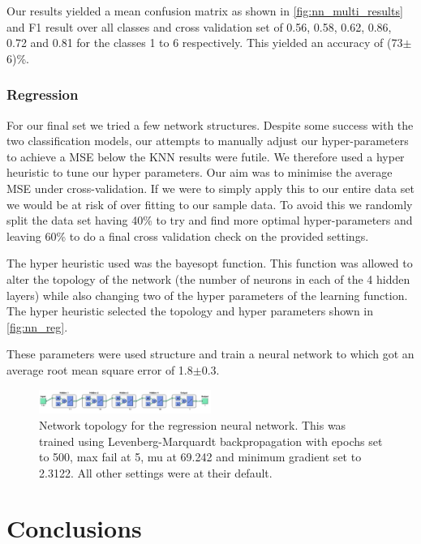 \documentclass[%
 reprint,
 amsmath,amssymb,
 aps,
]{revtex4-1}
\begin{document}
\par{Our results yielded a mean confusion matrix as shown in \autoref{fig:nn_multi_results} and F1 result over all classes and cross validation set of 0.56, 0.58, 0.62, 0.86, 0.72 and 0.81 for the classes 1 to 6 respectively. This yielded an accuracy of (73$\pm$6)\%.}


\subsubsection{Regression}

\par{For our final set we tried a few network structures. Despite some success with the two classification models, our attempts to manually adjust our hyper-parameters to achieve a MSE below the KNN results were futile. We therefore used a hyper heuristic to tune our hyper parameters. Our aim was to minimise the average MSE under cross-validation. If we were to simply apply this to our entire data set we would be at risk of over fitting to our sample data. To avoid this we randomly split the data set having 40\% to try and find more optimal hyper-parameters and leaving 60\% to do a final cross validation check on the provided settings.}
\par{The hyper heuristic used was the bayesopt\cite{bayesopt} function. This function was allowed to alter the topology of the network (the number of neurons in each of the 4 hidden layers) while also changing two of the hyper parameters of the learning function\cite{trainlm}. The hyper heuristic selected the topology and hyper parameters shown in \autoref{fig:nn_reg}.}
\par{These parameters were used structure and train a neural network to which got an average root mean square error of 1.8$\pm$0.3.}

\begin{figure}
    \centering
    \includegraphics[width=0.5\textwidth]{regresstopology1.png}
    \caption{Network topology for the regression neural network. This was trained using Levenberg-Marquardt backpropagation\cite{trainlm} with epochs set to 500, max fail at 5, mu at 69.242 and minimum gradient set to 2.3122. All other settings were at their default.}
    \label{fig:nn_reg}
\end{figure}

\section{Conclusions}





\end{document}
